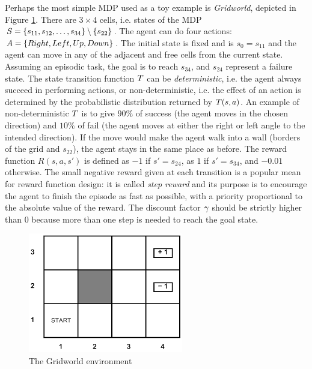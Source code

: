 \begin{example}\label{exa:gridworld} Perhaps the most simple MDP used as a toy example is \emph{Gridworld}, depicted in Figure \ref{fig:gridworld}.
There are $3\times 4$ cells, i.e. states of the MDP $S = \{s_{11}, s_{12}, \dots, s_{34}\}\setminus \{s_{22}\}$. The agent can do four actions: $A = \{Right, Left, Up, Down\}$. The initial state is fixed and is $s_0 = s_{11}$ and the agent can move in any of the adjacent and free cells from the current state. Assuming an episodic task, the goal is to reach $s_{34}$, and $s_{24}$ represent a failure state. The state transition function $T$ can be \emph{deterministic}, i.e. the agent always succeed in performing actions, or non-deterministic, i.e. the effect of an action is determined by the probabilistic distribution returned by $T(s, a)$. An example of non-deterministic $T$ is to give $90\%$ of success (the agent moves in the chosen direction) and $10\%$ of fail (the agent moves at either the right or left angle to the intended direction). If the move would make the agent walk into a wall (borders of the grid and $s_{22}$), the agent stays in the same place as before. The reward function $R(s,a,s')$ is defined as $-1$ if $s'=s_{24}$, as $1$ if $s'=s_{34}$, and $-0.01$ otherwise. The small negative reward given at each transition is a popular mean for reward function design: it is called \emph{step reward} and its purpose is to encourage the agent to finish the episode as fast as possible, with a priority proportional to the absolute value of the reward. The discount factor $\gamma$ should be strictly higher than 0 because more than one step is needed to reach the goal state.
	
\begin{figure}[h]
	\centering
	\caption{The Gridworld environment}\label{fig:gridworld}
	\includegraphics[width=.4\linewidth]{images/gridworld}
\end{figure}


\end{example}

